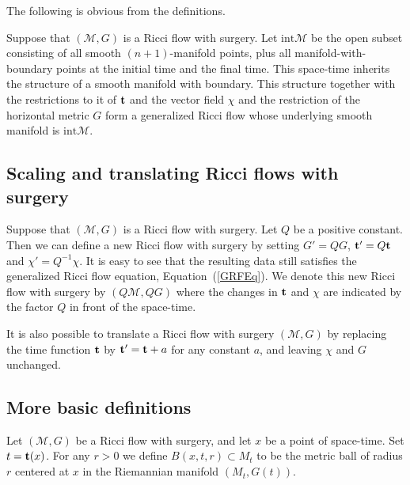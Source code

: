 The following is obvious from the definitions.

\begin{proposition}
\label{prop:interior-generalized-ricci-flow}
Suppose that $({\mathcal M},G)$ is a Ricci flow with surgery. Let
$\mathrm{int}{\mathcal M}$ be the open subset consisting of all
smooth $(n+1)$-manifold points, plus all manifold-with-boundary
points at the initial time and the final time. This space-time
inherits the structure of a smooth manifold with boundary. This
structure together with the restrictions to it of ${\bf t}$ and the
vector field $\chi$ and the restriction of the horizontal metric $G$
form a generalized Ricci flow whose underlying smooth manifold is $\mathrm{int}{\mathcal M}$.
\end{proposition}


\subsection{Scaling and translating Ricci flows with surgery}

Suppose that $({\mathcal M},G)$ is a Ricci flow with surgery. Let
$Q$ be a positive constant. Then we can define a new  Ricci flow
with surgery by setting $G'=QG$, ${\bf t'}=Q{\bf t}$ and
$\chi'=Q^{-1}\chi$. It is easy to see that the resulting data still
satisfies the generalized Ricci flow equation,
Equation~(\ref{GRFEq}). We denote this new  Ricci flow with surgery by
$(Q{\mathcal M},QG)$ where the changes in ${\bf t}$ and $\chi$ are
indicated by the factor $Q$ in front of the space-time.

It is also possible to translate a Ricci flow with surgery $({\mathcal
M},G)$ by replacing the time function ${\bf t}$ by ${\bf t'}={\bf
t}+a$ for any constant $a$, and leaving $\chi$ and $G$ unchanged.


\subsection{More basic definitions}



\begin{definition}
\label{def:metric-ball-spacetime}
Let $({\mathcal M},G)$ be a Ricci flow with surgery, and let $x$ be
a point of space-time. Set $t={\bf t}(x)$. For any  $r>0$ we define
$B(x,t,r)\subset M_t$ to be the metric ball of radius $r$ centered
at $x$ in the Riemannian manifold $(M_t,G(t))$.
\end{definition}

